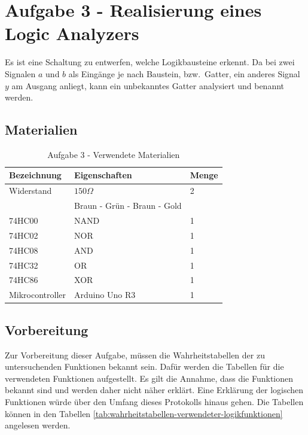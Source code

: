 \section{Aufgabe 3 - Realisierung eines Logic Analyzers}
\label{sec:aufgabe-3---realisierung-eines-logic-analyzers}

Es ist eine Schaltung zu entwerfen, welche Logikbausteine erkennt.
Da bei zwei Signalen $a$ und $b$ als Eingänge je nach Baustein, bzw.\ Gatter, ein anderes Signal $y$ am Ausgang anliegt, kann ein unbekanntes Gatter analysiert und benannt werden.


\subsection{Materialien}
\label{subsec:a3-materialien}

\begin{table}[h]
    \centering
    \caption{Aufgabe 3 - Verwendete Materialien}
    \label{tab:a3-materialien}
    \begin{tabular}{| l | l | l |}
        \hline
        Bezeichnung & Eigenschaften & Menge \\
        \hline
        Widerstand  & $150\Omega$   & 2     \\
        & Braun - Grün - Braun - Gold & \\
        74HC00 & NAND & 1 \\
        74HC02 & NOR  & 1\\
        74HC08 & AND & 1\\
        74HC32 & OR & 1\\
        74HC86 & XOR  & 1\\
        Mikrocontroller & Arduino Uno R3 & 1 \\
        \hline
    \end{tabular}
\end{table}


\subsection{Vorbereitung}
\label{subsec:a3-vorbereitung}

Zur Vorbereitung dieser Aufgabe, müssen die Wahrheitstabellen der zu untersuchenden Funktionen bekannt sein.
Dafür werden die Tabellen für die verwendeten Funktionen aufgestellt.
Es gilt die Annahme, dass die Funktionen bekannt sind und werden daher nicht näher erklärt.
Eine Erklärung der logischen Funktionen würde über den Umfang dieses Protokolls hinaus gehen.
Die Tabellen können in den Tabellen \ref{tab:wahrheitstabellen-verwendeter-logikfunktionen} angelesen werden.

